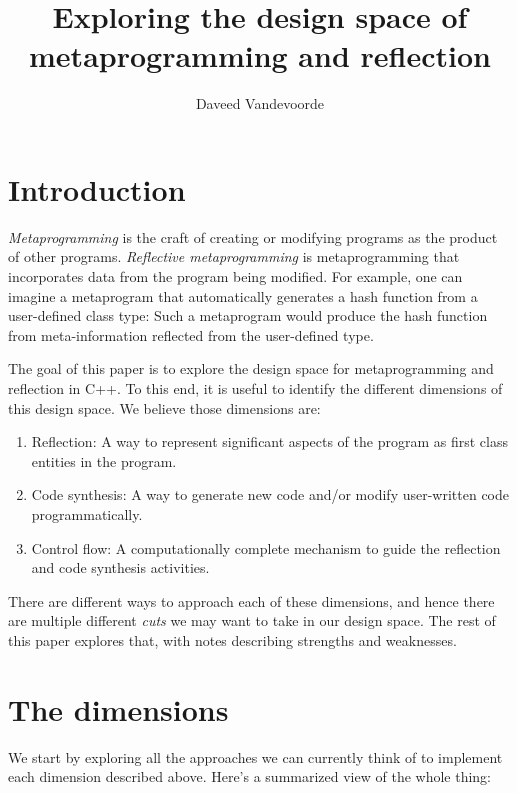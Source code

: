 \documentclass{wg21}
\title{Exploring the design space of metaprogramming and reflection}
\author{Daveed Vandevoorde}{daveed@edg.com}
\begin{document}
\maketitle


\section{Introduction}
\textit{Metaprogramming} is the craft of creating or modifying programs as the
product of other programs. \textit{Reflective metaprogramming} is metaprogramming
that incorporates data from the program being modified. For example, one can
imagine a metaprogram that automatically generates a hash function from a
user-defined class type: Such a metaprogram would produce the hash function
from meta-information reflected from the user-defined type.

The goal of this paper is to explore the design space for metaprogramming and
reflection in C++. To this end, it is useful to identify the different dimensions
of this design space. We believe those dimensions are:

\begin{enumerate}
  \item Reflection: A way to represent significant aspects of the program as
        first class entities in the program.
  \item Code synthesis: A way to generate new code and/or modify user-written
        code programmatically.
  \item Control flow: A computationally complete mechanism to guide the
        reflection and code synthesis activities.
\end{enumerate}

There are different ways to approach each of these dimensions, and hence there
are multiple different \textit{cuts} we may want to take in our design space.
The rest of this paper explores that, with notes describing strengths and
weaknesses.


\section{The dimensions}
We start by exploring all the approaches we can currently think of to implement
each dimension described above. Here's a summarized view of the whole thing:
\end{document}
